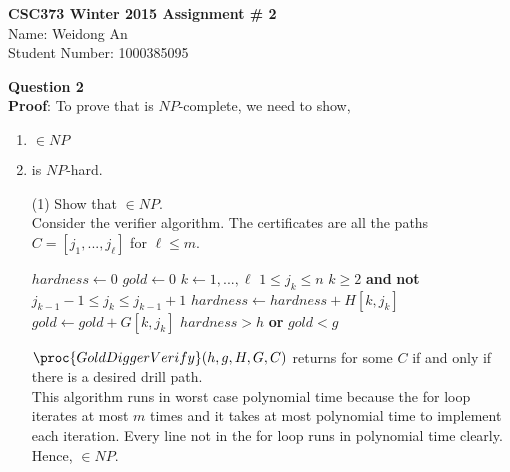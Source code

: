 \documentclass[11pt]{article}
\begin{document}
\begin{center}
{\bf \Large \bf CSC373 Winter 2015 Assignment \# 2}\\
Name: Weidong An\\
Student Number: 1000385095
\end{center}
{\bf Question 2}\\
{\bf Proof}: To prove that  is $NP$-complete, we need to show, 
\begin{enumerate}
\item {} $\in NP$
\item {} is $NP$-hard.
\end{enumerate}
\begin{enumerate}
\item[(1)] Show that  $\in NP$.\\
Consider the verifier algorithm. The certificates are all the paths $C = [j_1, ..., j_\ell]$ for $\ell \leq m$.
\begin{codebox}
    \zi $hardness \gets 0$
    \zi $gold \gets 0$
    \zi \For $k \gets 1, ..., \ell$
    \zi     \Then {} $1 \leq j_k \leq n$
    \zi            \Then \Return {} \End
    \zi           \If $k \geq 2$ {\bf and} {\bf not} $j_{k-1} - 1 \leq j_k \leq j_{k-1} +1$
    \zi                \Then \Return {}\End
    \zi      $hardness \gets hardness + H[k, j_k]$
    \zi      $gold \gets gold + G[k, j_k]$\End
    \zi \If $hardness > h$ {\bf or} $gold < g$
    \zi      \Then \Return {}\End
    \zi \Return {}
\end{codebox}
$\proc{GoldDiggerVerify}(h, g, H, G, C)$ returns  for some $C$ if and only if there is a desired drill path.\\
This algorithm runs in worst case polynomial time because the for loop iterates at most $m$ times and it takes at most polynomial time to implement each iteration. Every line not in the for loop runs in polynomial time clearly.\\
Hence,  $\in NP$.


\end{enumerate}
\end{document}
